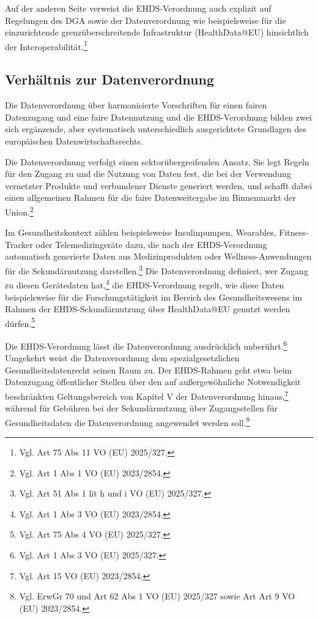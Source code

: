 Auf der anderen Seite verweist die EHDS-Verordnung auch explizit auf Regelungen des DGA sowie der Datenverordnung wie beispielsweise für die einzurichtende grenzüberschreitende Infrastruktur (HealthData@EU) hinsichtlich der Interoperabilität.\footnote{Vgl. Art 75 Abs 11 VO (EU) 2025/327.}
        \subsection{Verhältnis zur Datenverordnung}
Die Datenverordnung über harmonisierte Vorschriften für einen fairen Datenzugang und eine faire Datennutzung und die EHDS-Verordnung bilden zwei sich ergänzende, aber systematisch unterschiedlich ausgerichtete Grundlagen des europäischen Datenwirtschaftsrechts.

Die Datenverordnung verfolgt einen sektorübergreifenden Ansatz. Sie legt Regeln für den Zugang zu und die Nutzung von Daten fest, die bei der Verwendung vernetzter Produkte und verbundener Dienste generiert werden, und schafft dabei einen allgemeinen Rahmen für die faire Datenweitergabe im Binnenmarkt der Union.\footnote{Vgl. Art 1 Abs 1 VO (EU) 2023/2854.}

Im Gesundheitskontext zählen beispielsweise Insulinpumpen, Wearables, Fitness-Tracker oder Telemedizingeräte dazu, die nach der EHDS-Verordnung automatisch generierte Daten aus Medizinprodukten oder Wellness-Anwendungen für die Sekundärnutzung darstellen.\footnote{Vgl. Art 51 Abs 1 lit h und i VO (EU) 2025/327.} Die Datenverordnung definiert, wer Zugang zu diesen Gerätedaten hat,\footnote{Vgl. Art 1 Abs 3 VO (EU) 2023/2854.} die EHDS-Verordnung regelt, wie diese Daten beispielsweise für die Forschungstätigkeit im Bereich des Gesundheitswesens im Rahmen der EHDS-Sekundärnutzung über HealthData@EU genutzt werden dürfen.\footnote{Vgl. Art 75 Abs 4 VO (EU) 2025/327.}

Die EHDS-Verordnung lässt die Datenverordnung ausdrücklich unberührt.\footnote{Vgl. Art 1 Abs 3 VO (EU) 2025/327.} Umgekehrt weist die Datenverordnung dem spezialgesetzlichen Gesundheitsdatenrecht seinen Raum zu. Der EHDS-Rahmen geht etwa beim Datenzugang öffentlicher Stellen über den auf außergewöhnliche Notwendigkeit beschränkten Geltungsbereich von Kapitel V der Datenverordnung hinaus,\footnote{Vgl. Art 15 VO (EU) 2023/2854.} während für Gebühren bei der Sekundärnutzung über Zugangsstellen für Gesundheitsdaten die Datenverordnung angewendet werden soll.\footnote{Vgl. ErwGr 70 und Art 62 Abs 1 VO (EU) 2025/327 sowie Art Art 9 VO (EU) 2023/2854.}

